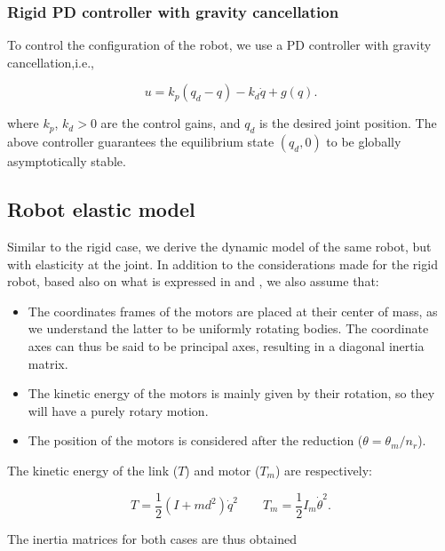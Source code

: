 \documentclass[a4paper]{article}
\begin{document}
\subsubsection{Rigid PD controller with gravity cancellation}
To control the configuration of the robot, we use a PD controller with gravity cancellation,i.e.,

\begin{equation}
    \label{eq:controller}
    u = k_p(q_d-q) - k_d\dot{q} + g(q).
\end{equation}

where $k_p$, $k_d > 0$ are the control gains, and $q_d$ is the desired joint position. The above controller guarantees the equilibrium state $(q_d,0)$ to be globally asymptotically stable.
\newline

\subsection{Robot elastic model}
Similar to the rigid case, we derive the dynamic model of the same robot, but with elasticity at the joint. In addition to the considerations made for the rigid robot, based also on what is expressed in \cite{sponge} and \cite{tomei}, we also assume that:

\begin{itemize}
    \item The coordinates frames of the motors are placed at their center of mass, as we understand the latter to be uniformly rotating bodies. The coordinate axes can thus be said to be principal axes, resulting in a diagonal inertia matrix.
    \item The kinetic energy of the motors is mainly given by their rotation, so they will have a purely rotary motion.
    \item The position of the motors is considered after the reduction ($\theta = \theta_m / n_r$). \\
\end{itemize}

The kinetic energy of the link ($T$) and motor ($T_m$) are respectively:

\begin{equation}
    \nonumber
    T = \frac{1}{2} (I + md^2)\dot{q}^2 \qquad T_m = \frac{1}{2} I_m \dot{\theta}^2.
\end{equation}

The inertia matrices for both cases are thus obtained
\end{document}
